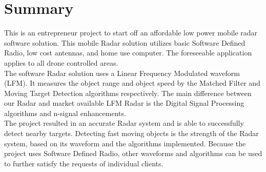 \documentclass[letterpaper, 12 pt, conference]{report}
\numberwithin{figure}{section}
\begin{document}
\tableofcontents
\protect\thispagestyle{fancy}
\clearpage

\listoffigures
\protect\thispagestyle{fancy}
\clearpage
\section{Summary}
This is an entrepreneur project to start off an affordable low power mobile radar software solution. This mobile Radar solution utilizes basic Software Defined Radio, low cost antennas, and home use computer. The foreseeable application applies to all drone controlled areas.\\

The software Radar solution uses a Linear Frequency Modulated waveform (LFM). It measures the object range and object speed by the Matched Filter and Moving Target Detection algorithms respectively. The main difference between our Radar and market available LFM Radar is the Digital Signal Processing algorithms and n-signal enhancements.\\

The project resulted in an accurate Radar system and is able to successfully detect nearby targets. Detecting fast moving objects is the strength of the Radar system, based on its waveform and the algorithms implemented. Because the project uses Software Defined Radio, other waveforms and algorithms can be used to further satisfy the requests of individual clients.
\clearpage

\end{document}
